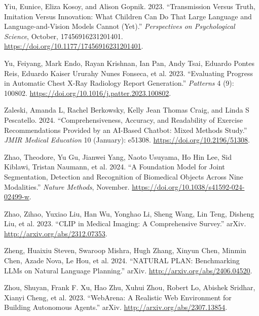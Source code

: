 \documentclass[
  Letterpaper,
]{scrbook}
\newlength{\cslhangindent}
\newenvironment{CSLReferences}[2] %
 {\begin{list}{}{%
  \setlength{\itemindent}{0pt}
  \setlength{\leftmargin}{0pt}
  \setlength{\parsep}{0pt}
  \ifodd #1
   \setlength{\leftmargin}{\cslhangindent}
   \setlength{\itemindent}{-1\cslhangindent}
  \fi
  \setlength{\itemsep}{#2\baselineskip}}}
 {\end{list}}
\begin{document}
\begin{CSLReferences}{1}{0}
Yiu, Eunice, Eliza Kosoy, and Alison Gopnik. 2023. {``Transmission
{Versus} {Truth}, {Imitation} {Versus} {Innovation}: {What} {Children}
{Can} {Do} {That} {Large} {Language} and {Language}-and-{Vision}
{Models} {Cannot} ({Yet}).''} \emph{Perspectives on Psychological
Science}, October, 17456916231201401.
\url{https://doi.org/10.1177/17456916231201401}.

Yu, Feiyang, Mark Endo, Rayan Krishnan, Ian Pan, Andy Tsai, Eduardo
Pontes Reis, Eduardo Kaiser Ururahy Nunes Fonseca, et al. 2023.
{``Evaluating Progress in Automatic Chest {X}-Ray Radiology Report
Generation.''} \emph{Patterns} 4 (9): 100802.
\url{https://doi.org/10.1016/j.patter.2023.100802}.

Zaleski, Amanda L, Rachel Berkowsky, Kelly Jean Thomas Craig, and Linda
S Pescatello. 2024. {``Comprehensiveness, {Accuracy}, and {Readability}
of {Exercise} {Recommendations} {Provided} by an {AI}-{Based} {Chatbot}:
{Mixed} {Methods} {Study}.''} \emph{JMIR Medical Education} 10
(January): e51308. \url{https://doi.org/10.2196/51308}.

Zhao, Theodore, Yu Gu, Jianwei Yang, Naoto Usuyama, Ho Hin Lee, Sid
Kiblawi, Tristan Naumann, et al. 2024. {``A Foundation Model for Joint
Segmentation, Detection and Recognition of Biomedical Objects Across
Nine Modalities.''} \emph{Nature Methods}, November.
\url{https://doi.org/10.1038/s41592-024-02499-w}.

Zhao, Zihao, Yuxiao Liu, Han Wu, Yonghao Li, Sheng Wang, Lin Teng,
Disheng Liu, et al. 2023. {``{CLIP} in {Medical} {Imaging}: {A}
{Comprehensive} {Survey}.''} arXiv.
\url{http://arxiv.org/abs/2312.07353}.

Zheng, Huaixiu Steven, Swaroop Mishra, Hugh Zhang, Xinyun Chen, Minmin
Chen, Azade Nova, Le Hou, et al. 2024. {``{NATURAL} {PLAN}:
{Benchmarking} {LLMs} on {Natural} {Language} {Planning}.''} arXiv.
\url{http://arxiv.org/abs/2406.04520}.

Zhou, Shuyan, Frank F. Xu, Hao Zhu, Xuhui Zhou, Robert Lo, Abishek
Sridhar, Xianyi Cheng, et al. 2023. {``{WebArena}: {A} {Realistic} {Web}
{Environment} for {Building} {Autonomous} {Agents}.''} arXiv.
\url{http://arxiv.org/abs/2307.13854}.

\end{CSLReferences}


\backmatter

\printindex
\end{document}
